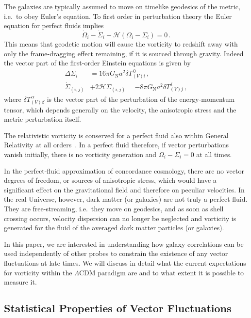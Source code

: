 \documentclass[a4paper,twocolumn,aps,prd,nolongbibliography,superscriptaddress,showpacs,showkeys,amsmath,amssymb,floatfix,nofootinbib]{revtex4-1}
\renewcommand{\[}{\begin{equation}}
\renewcommand{\]}{\end{equation}}
\begin{document}
The galaxies are typically assumed to move on timelike geodesics of the metric, i.e.\ to obey Euler's equation.
To first order in perturbation theory the Euler equation for perfect fluids implies
\begin{equation}
\dot{\Omega}_i - \dot{\Sigma}_i  + \mathcal{H} (\Omega_i-\Sigma_i) = 0 \,. \label{eq:vecgeo}
\end{equation}
This means that geodetic motion will cause the vorticity to redshift away with only the frame-dragging  effect remaining, if it is sourced through gravity. Indeed the vector part of the first-order Einstein equations is given by
\begin{align}
\Delta \Sigma_i &= 16\pi G_\text{N}a^2 \delta T^{\,0}_{(V)i}\, , \\
\dot{\Sigma}_{(i,j)}&+2\mathcal{H} \Sigma_{(i,j)}=-8\pi G_\text{N}a^2 \delta T^{\,i}_{(V)j}\, ,
\end{align}
where $\delta T^{\,\alpha}_{(V)\beta}$ is the vector part of the perturbation of the energy-momentum tensor, which depends generally on the velocity, the anisotropic stress and the metric perturbation itself.

The relativistic vorticity is conserved for a perfect fluid also within General Relativity at all orders~\cite{Lu:2008ju}.
In a perfect fluid therefore, if vector perturbations vanish initially, there is no vorticity generation and $\Omega_i-\Sigma_i=0$ at all times. 

In the perfect-fluid approximation of concordance cosmology, there are no vector degrees of freedom, or sources of anisotropic stress, which would have a significant effect on the gravitational field and therefore on peculiar velocities. In the real Universe, however, dark matter (or galaxies) are not truly a perfect fluid. They are free-streaming, i.e.\ they move on geodesics, and as soon as shell crossing occurs, velocity dispersion can no longer be neglected and vorticity is generated for the fluid of the averaged dark matter particles (or galaxies).


In this paper, we are interested in understanding how galaxy correlations can be used independently of other probes to constrain the existence of any vector fluctuations at late times. We will discuss in detail what the current expectations for vorticity within the $\Lambda$CDM paradigm are and to what extent it is possible to measure it.

\subsection{Statistical Properties of Vector Fluctuations}
\end{document}
